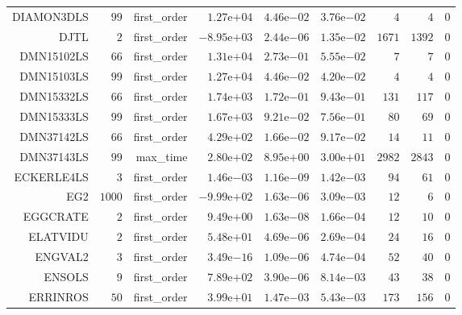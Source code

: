 \begin{longtable}{rrrrrrrrr}
DIAMON3DLS & \(    99\) & first\_order & \( 1.27\)e\(+04\) & \( 4.46\)e\(-02\) & \( 3.76\)e\(-02\) & \(     4\) & \(     4\) & \(     0\) \\
DJTL & \(     2\) & first\_order & \(-8.95\)e\(+03\) & \( 2.44\)e\(-06\) & \( 1.35\)e\(-02\) & \(  1671\) & \(  1392\) & \(     0\) \\
DMN15102LS & \(    66\) & first\_order & \( 1.31\)e\(+04\) & \( 2.73\)e\(-01\) & \( 5.55\)e\(-02\) & \(     7\) & \(     7\) & \(     0\) \\
DMN15103LS & \(    99\) & first\_order & \( 1.27\)e\(+04\) & \( 4.46\)e\(-02\) & \( 4.20\)e\(-02\) & \(     4\) & \(     4\) & \(     0\) \\
DMN15332LS & \(    66\) & first\_order & \( 1.74\)e\(+03\) & \( 1.72\)e\(-01\) & \( 9.43\)e\(-01\) & \(   131\) & \(   117\) & \(     0\) \\
DMN15333LS & \(    99\) & first\_order & \( 1.67\)e\(+03\) & \( 9.21\)e\(-02\) & \( 7.56\)e\(-01\) & \(    80\) & \(    69\) & \(     0\) \\
DMN37142LS & \(    66\) & first\_order & \( 4.29\)e\(+02\) & \( 1.66\)e\(-02\) & \( 9.17\)e\(-02\) & \(    14\) & \(    11\) & \(     0\) \\
DMN37143LS & \(    99\) & max\_time & \( 2.80\)e\(+02\) & \( 8.95\)e\(+00\) & \( 3.00\)e\(+01\) & \(  2982\) & \(  2843\) & \(     0\) \\
ECKERLE4LS & \(     3\) & first\_order & \( 1.46\)e\(-03\) & \( 1.16\)e\(-09\) & \( 1.42\)e\(-03\) & \(    94\) & \(    61\) & \(     0\) \\
EG2 & \(  1000\) & first\_order & \(-9.99\)e\(+02\) & \( 1.63\)e\(-06\) & \( 3.09\)e\(-03\) & \(    12\) & \(     6\) & \(     0\) \\
EGGCRATE & \(     2\) & first\_order & \( 9.49\)e\(+00\) & \( 1.63\)e\(-08\) & \( 1.66\)e\(-04\) & \(    12\) & \(    10\) & \(     0\) \\
ELATVIDU & \(     2\) & first\_order & \( 5.48\)e\(+01\) & \( 4.69\)e\(-06\) & \( 2.69\)e\(-04\) & \(    24\) & \(    16\) & \(     0\) \\
ENGVAL2 & \(     3\) & first\_order & \( 3.49\)e\(-16\) & \( 1.09\)e\(-06\) & \( 4.74\)e\(-04\) & \(    52\) & \(    40\) & \(     0\) \\
ENSOLS & \(     9\) & first\_order & \( 7.89\)e\(+02\) & \( 3.90\)e\(-06\) & \( 8.14\)e\(-03\) & \(    43\) & \(    38\) & \(     0\) \\
ERRINROS & \(    50\) & first\_order & \( 3.99\)e\(+01\) & \( 1.47\)e\(-03\) & \( 5.43\)e\(-03\) & \(   173\) & \(   156\) & \(     0\) \\

\end{longtable}
